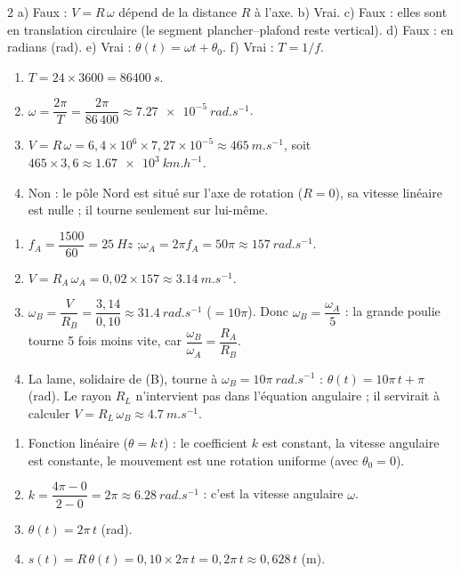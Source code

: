 \documentclass[11pt,a4paper]{article}
\begin{document}
\begin{multicols}{2}
a) Faux : $V = R\,\omega$ dépend de la distance $R$ à l’axe. \quad b) Vrai. \quad c) Faux : elles sont en translation circulaire (le segment plancher–plafond reste vertical). \quad d) Faux : en radians (rad). \quad e) Vrai : $\theta(t) = \omega t + \theta_0$. \quad f) Vrai : $T = 1/f$.

\begin{enumerate}[label={\sffamily\bfseries\arabic*.},leftmargin=5mm,itemsep=1pt]
  \item $T = 24\times3600 = \qty{86400}{s}$.
  \item $\omega = \dfrac{2\pi}{T} = \dfrac{2\pi}{86\,400} \approx \qty{7,27e-5}{rad.s^{-1}}$.
  \item $V = R\,\omega = 6{,}4\times10^{6}\times7{,}27\times10^{-5} \approx \qty{465}{m.s^{-1}}$, soit $465\times3{,}6 \approx \qty{1,67e3}{km.h^{-1}}$.
  \item Non : le pôle Nord est situé sur l’axe de rotation ($R = 0$), sa vitesse linéaire est nulle ; il tourne seulement sur lui-même.
\end{enumerate}

\begin{enumerate}[label={\sffamily\bfseries\arabic*.},leftmargin=5mm,itemsep=1pt]
  \item $f_A = \dfrac{1500}{60} = \qty{25}{Hz}$ ;\quad $\omega_A = 2\pi f_A = 50\pi \approx \qty{157}{rad.s^{-1}}$.
  \item $V = R_A\,\omega_A = 0{,}02\times157 \approx \qty{3,14}{m.s^{-1}}$.
  \item $\omega_B = \dfrac{V}{R_B} = \dfrac{3{,}14}{0{,}10} \approx \qty{31,4}{rad.s^{-1}}$ ($=10\pi$). Donc $\omega_B = \dfrac{\omega_A}{5}$ : la grande poulie tourne 5 fois moins vite, car $\dfrac{\omega_B}{\omega_A} = \dfrac{R_A}{R_B}$.
  \item La lame, solidaire de (B), tourne à $\omega_B = 10\pi~\unit{rad.s^{-1}}$ : $\theta(t) = 10\pi\,t + \pi$ (rad). Le rayon $R_L$ n’intervient pas dans l’équation angulaire ; il servirait à calculer $V = R_L\,\omega_B \approx \qty{4,7}{m.s^{-1}}$.
\end{enumerate}

\begin{enumerate}[label={\sffamily\bfseries\arabic*.},leftmargin=5mm,itemsep=1pt]
  \item Fonction linéaire ($\theta = k\,t$) : le coefficient $k$ est constant, la vitesse angulaire est constante, le mouvement est une rotation uniforme (avec $\theta_0 = 0$).
  \item $k = \dfrac{4\pi - 0}{2 - 0} = 2\pi \approx \qty{6,28}{rad.s^{-1}}$ : c’est la vitesse angulaire $\omega$.
  \item $\theta(t) = 2\pi\,t$ (rad).
  \item $s(t) = R\,\theta(t) = 0{,}10\times2\pi\,t = 0{,}2\pi\,t \approx 0{,}628\,t$ (m).
\end{enumerate}
\end{multicols}
\end{document}
